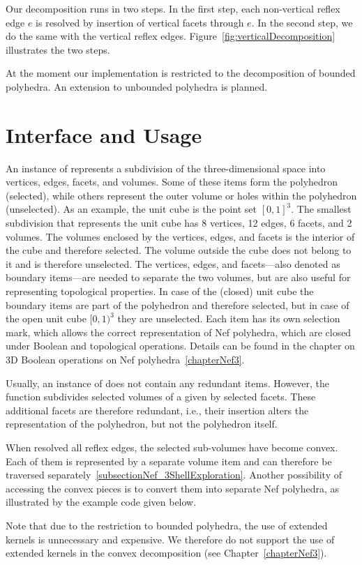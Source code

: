 Our decomposition runs in two steps. In the first step, each
non-vertical reflex edge $e$ is resolved by insertion of vertical
facets through $e$. In the second step, we do the same with the
vertical reflex edges. Figure~\ref{fig:verticalDecomposition}
illustrates the two steps.

At the moment our implementation is restricted to the decomposition of
bounded polyhedra. An extension to unbounded polyhedra is planned.

\section{Interface and Usage}

An instance of  represents a subdivision of the
three-dimensional space into vertices, edges, facets, and
volumes. Some of these items form the polyhedron (selected), while
others represent the outer volume or holes within the polyhedron
(unselected). As an example, the unit cube is the point set
$[0,1]^3$. The smallest subdivision that represents the unit cube has
8 vertices, 12 edges, 6 facets, and 2 volumes. The volumes enclosed by
the vertices, edges, and facets is the interior of the cube and
therefore selected. The volume outside the cube does not belong to it
and is therefore unselected. The vertices, edges, and facets---also
denoted as boundary items---are needed to separate the two volumes,
but are also useful for representing topological properties. In case
of the (closed) unit cube the boundary items are part of the
polyhedron and therefore selected, but in case of the open unit cube
$[0,1)^3$ they are unselected. Each item has its own selection mark,
which allows the correct representation of Nef polyhedra, which are
closed under Boolean and topological operations. Details can be found
in the chapter on 3D Boolean operations on Nef
polyhedra~\ref{chapterNef3}.

Usually, an instance of  does not contain any
redundant items. However, the function 
subdivides selected volumes of a given  by
selected facets. These additional facets are therefore redundant,
i.e., their insertion alters the representation of the polyhedron, but
not the polyhedron itself. 

When  resolved all reflex edges, the
selected sub-volumes have become convex. Each of them is represented
by a separate volume item and can therefore be traversed
separately~\ref{subsectionNef_3ShellExploration}. Another possibility
of accessing the convex pieces is to convert them into separate Nef
polyhedra, as illustrated by the example code given below.

Note that due to the restriction to bounded polyhedra, the use of
extended kernels is unnecessary and expensive. We therefore do not
support the use of extended kernels in the convex decomposition 
(see Chapter~\ref{chapterNef3}).

